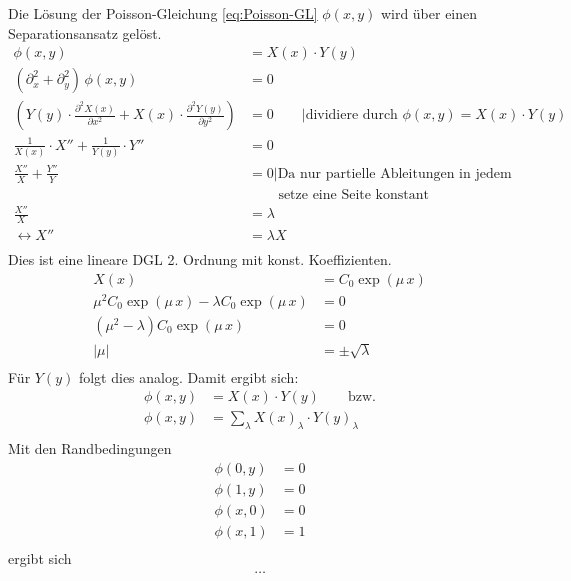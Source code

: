 Die Lösung der Poisson-Gleichung \ref{eq:Poisson-GL} $\phi(x,y)$ wird über einen Separationsansatz gelöst.\begin{equation*}
	\begin{split}
		\phi(x,y) &= X(x)\cdot Y(y)\\
		\left( \partial_x^2 + \partial_y^2 \right)\,\phi(x,y) &= 0 \\
		\left( Y(y) \cdot \frac{\partial^2 X(x)}{\partial x^2} + X(x) \cdot \frac{\partial^2 Y(y)}{\partial y^2} \right) &= 0 \qquad |\text{dividiere durch }\phi(x,y) = X(x)\cdot  Y(y)\\
		\frac{1}{X(x)} \cdot X'' + \frac{1}{Y(y)} \cdot Y'' &= 0 \\
		\frac{X''}{X} + \frac{Y''}{Y} &= 0 |\text{Da nur partielle Ableitungen in jedem Summand auftauchen,}\\ &\qquad\,\text{setze eine Seite konstant} \\
		\frac{X''}{X} &= \lambda \\
		\leftrightarrow X'' &= \lambda X \\
	\end{split}
\end{equation*}
Dies ist eine lineare DGL 2. Ordnung mit konst. Koeffizienten.
\begin{equation*}
	\begin{split}
		X(x) &= C_0 \exp(\mu\,x) \\
		\mu^2 C_0 \exp(\mu\,x) - \lambda C_0 \exp(\mu\,x) &= 0\\
		(\mu^2 - \lambda) C_0 \exp(\mu\,x) &= 0 \\
		|\mu| &= \pm \sqrt{\lambda} \\
	\end{split}
\end{equation*}
Für $Y(y)$ folgt dies analog. Damit ergibt sich:
\begin{equation*}
	\begin{split}
		\phi(x,y) &= X(x) \cdot Y(y)\qquad\text{bzw.} \\
		\phi(x,y) &= \sum_{\lambda} X(x)_{\lambda}\cdot Y(y)_{\lambda}\\
	\end{split}
\end{equation*}
Mit den Randbedingungen
\begin{equation*}
	\begin{split}
		\phi(0,y) &= 0 \\
		\phi(1,y) &= 0 \\
		\phi(x,0) &= 0 \\
		\phi(x,1) &= 1 \\
	\end{split}
\end{equation*}
ergibt sich
\begin{equation*}
	\begin{split}
		\dots
	\end{split}
\end{equation*}

